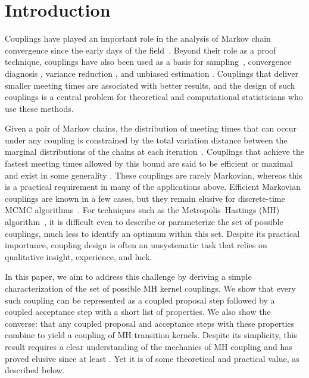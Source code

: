 \documentclass[aihp]{imsart}
\theoremstyle{plain}
\theoremstyle{remark}
\theoremstyle{definition} \newtheorem{example}{Example}
\begin{document}
\section{Introduction}
\label{sec:intro}

Couplings have played an important role in the analysis of Markov chain convergence since the early
days of the field~\citep{doeblin1938expose, harris1955chains}. Beyond their role as a proof
technique, couplings have also been used as a basis for sampling~\citep{propp:wilson:1996,
	fill1997interruptible, neal1999circularly,flegal2012exact}, convergence diagnosis
\citep{johnson1996studying, johnson1998coupling, biswas2019estimating}, variance reduction
\citep{neal2001improving,Goodman2009,piponi2020hamiltonian}, and unbiased estimation
\citep{glynn2014exact, Jacob2020, heng2019,pmlr-v89-middleton19a, Middleton2020, heng2021aunbiased,
	heng2021bunbiased}. Couplings that deliver smaller meeting times are associated with better results,
and the design of such couplings is a central problem for theoretical and computational
statisticians who use these methods.

Given a pair of Markov chains, the distribution of meeting times that can occur under any coupling
is constrained by the total variation distance between the marginal distributions of the chains at
each iteration~\citep{aldous1983random, lindvall2002lectures}. Couplings that achieve the fastest
meeting times allowed by this bound are said to be efficient or maximal and exist in some generality
\citep{griffeath1975maximal, pitman1976coupling, goldstein1979maximal}. These couplings are rarely
Markovian, whereas this is a practical requirement in many of the applications above. Efficient
Markovian couplings are known in a few cases, but they remain elusive for discrete-time MCMC
algorithms~\citep{burdzy2000efficient, connor2008optimal, kuwada2009characterization,
	hsu2013maximal, kendall2015coupling, bottcher2017markovian, banerjee2017rigidity}. For techniques
such as the Metropolis--Hastings (MH) algorithm~\citep{Metropolis1953, hastings:1970}, it is
difficult even to describe or parameterize the set of possible couplings, much less to identify an
optimum within this set. Despite its practical importance, coupling design is often an unsystematic
task that relies on qualitative insight, experience, and luck.

In this paper, we aim to address this challenge by deriving a simple characterization of the set of
possible MH kernel couplings. We show that every such coupling can be represented as a coupled
proposal step followed by a coupled acceptance step with a short list of properties. We also show
the converse: that any coupled proposal and acceptance steps with these properties combine to yield
a coupling of MH transition kernels. Despite its simplicity, this result requires a clear
understanding of the mechanics of MH coupling and has proved elusive since at least
\citet{johnson1998coupling}. Yet it is of some theoretical and practical value, as described below.
\end{document}
